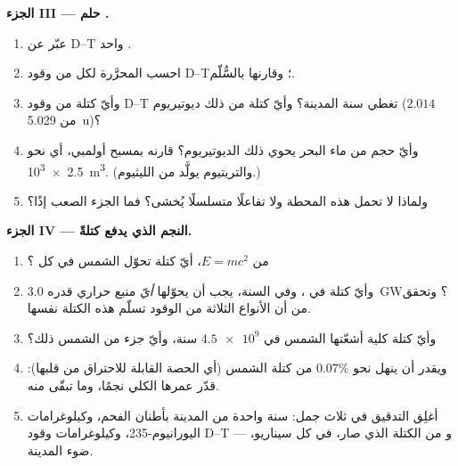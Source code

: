 \begin{problem}
\medskip
\noindent\textbf{الجزء III --- حلم .}
\begin{enumerate}[resume]
  \item عبّر عن   D--T واحد .
  \item احسب  المحرَّرة لكل  من وقود D--T؛ وقارنها
        بالسُّلّم.
  \item وأيّ كتلة من وقود D--T تغطي سنة المدينة؟ وأيّ كتلة من ذلك
        ديوتيريوم ($2.014$ من \qty{5.029}{u})؟
  \item وأيّ حجم من ماء البحر يحوي ذلك الديوتيريوم؟ قارنه
        بمسبح أولمبي، أي نحو \qty{2.5e3}{m^3}. (والتريتيوم يولَّد من الليثيوم.)
  \item ولماذا لا تحمل هذه المحطة  ولا تفاعلًا متسلسلًا
        يُخشى؟ فما الجزء الصعب إذًا؟
\end{enumerate}

\medskip
\noindent\textbf{الجزء IV --- النجم الذي يدفع كتلةً.}
\begin{enumerate}[resume]
  \item من $E = mc^2$، أيّ كتلة تحوّل الشمس في كل ؟
  \item وأيّ كتلة في ، وفي السنة، يجب أن يحوّلها \emph{أيّ}
        منبع حراري قدره \qty{3.0}{GW}؟ وتحقق من أن الأنواع الثلاثة من الوقود
        تسلّم هذه الكتلة نفسها.
  \item وأيّ كتلة كلية أشعّتها الشمس في $\num{4.5e9}$
        سنة، وأيّ جزء من الشمس ذلك؟
  \item ويقدر  أن ينهل نحو $0.07\%$ من كتلة الشمس (أي الحصة القابلة للاحتراق من
        قلبها): قدّر عمرها الكلي نجمًا، وما تبقّى منه.
  \item أغلِق التدقيق في ثلاث جمل: سنة واحدة من المدينة بأطنان
        الفحم، وكيلوغرامات اليورانيوم-235، وكيلوغرامات وقود D--T --- و
         من الكتلة الذي صار، في كل سيناريو، ضوء المدينة.
\end{enumerate}
\end{problem}
